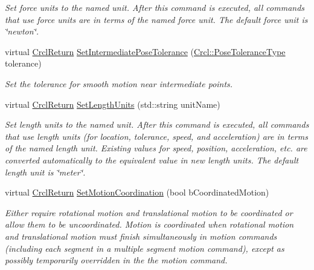 \begin{DoxyCompactItemize}
\begin{DoxyCompactList}\small\item\em Set force units to the named unit. After this command is executed, all commands that use force units are in terms of the named force unit. The default force unit is \char`\"{}newton\char`\"{}. \end{DoxyCompactList}\item 
virtual \hyperlink{namespaceCrcl_a1ed3b29723118a020251dde9b12733c0}{Crcl\-Return} \hyperlink{classCrcl_1_1CrclDelegateInterface_a0bf311ad72c05dbdf43eb1d17a2f6458}{Set\-Intermediate\-Pose\-Tolerance} (\hyperlink{namespaceCrcl_ac805071e16341b82d4fa4e12b7f3ac6f}{Crcl\-::\-Pose\-Tolerance\-Type} tolerance)
\begin{DoxyCompactList}\small\item\em Set the tolerance for smooth motion near intermediate points. \end{DoxyCompactList}\item 
virtual \hyperlink{namespaceCrcl_a1ed3b29723118a020251dde9b12733c0}{Crcl\-Return} \hyperlink{classCrcl_1_1CrclDelegateInterface_a8a3a26ceedee34111d177ecfa31bc978}{Set\-Length\-Units} (std\-::string unit\-Name)
\begin{DoxyCompactList}\small\item\em Set length units to the named unit. After this command is executed, all commands that use length units (for location, tolerance, speed, and acceleration) are in terms of the named length unit. Existing values for speed, position, acceleration, etc. are converted automatically to the equivalent value in new length units. The default length unit is \char`\"{}meter\char`\"{}. \end{DoxyCompactList}\item 
virtual \hyperlink{namespaceCrcl_a1ed3b29723118a020251dde9b12733c0}{Crcl\-Return} \hyperlink{classCrcl_1_1CrclDelegateInterface_aa0d4f4101f60374097d50126c35bcc74}{Set\-Motion\-Coordination} (bool b\-Coordinated\-Motion)
\begin{DoxyCompactList}\small\item\em Either require rotational motion and translational motion to be coordinated or allow them to be uncoordinated. Motion is coordinated when rotational motion and translational motion must finish simultaneously in motion commands (including each segment in a multiple segment motion command), except as possibly temporarily overridden in the the motion command. \end{DoxyCompactList}\item 

\end{DoxyCompactItemize}
